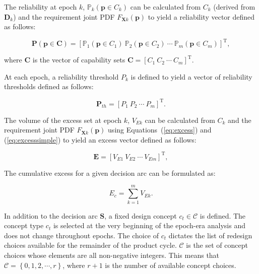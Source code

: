 The reliability at epoch $k$, $\mathbb{P}_k(\mathbf{p} \in C_k)$ can be calculated from $C_k$ (derived from $\mathbf{D}_k$) and the requirement joint \ac{PDF} $F_{\mathbf{X}k}(\mathbf{p})$ to yield a reliability vector defined as follows:

\begin{equation} \label{eq:reliabilityvector}
	\mathbf{P}(\mathbf{p} \in \mathbf{C}) = \left[\mathbb{P}_1(\mathbf{p} \in C_1) ~ \mathbb{P}_2(\mathbf{p} \in C_2) ~ \cdots ~ \mathbb{P}_m(\mathbf{p} \in C_m)\right]^{\mathrm{T}},
\end{equation}

where $\mathbf{C}$ is the vector of capability sets $\mathbf{C} = \left[C_1 ~ C_2 ~ \cdots ~ C_m\right]^{\mathrm{T}}$.

At each epoch, a reliability threshold $P_k$ is defined to yield a vector of reliability thresholds defined as follows:

\begin{equation} \label{eq:reliabilitythvector}
	\mathbf{P}_{th} = \left[P_1 ~ P_2 ~ \cdots ~ P_m\right]^{\mathrm{T}}.
\end{equation}

The volume of the excess set at epoch $k$, $V_{Ek}$ can be calculated from $C_k$ and the requirement joint \ac{PDF} $F_{\mathbf{X}k}(\mathbf{p})$ using Equations~(\ref{eq:excess}) and (\ref{eq:excesssimple}) to yield an excess vector defined as follows:

\begin{equation} \label{eq:excessvector}
	\mathbf{E} = \left[V_{E1} ~ V_{E2} ~ \cdots ~ V_{Em}\right]^{\mathrm{T}},
\end{equation}

The cumulative excess for a given decision arc can be formulated as:

\begin{equation} \label{eq:excesscumulative}
	E_c = \sum\limits_{k=1}^{m} V_{Ek}.
\end{equation}

In addition to the decision arc $\mathbf{S}$, a fixed design concept $c_t\in\mathcal{C}$ is defined. The concept type $c_t$ is selected at the very beginning of the epoch-era analysis and does not change throughout epochs. The choice of $c_t$ dictates the list of redesign choices available for the remainder of the product cycle. $\mathcal{C}$ is the set of concept choices whose elements are all non-negative integers. This means that $\mathcal{C} = \left\{0,1,2,\cdots,r\right\}$, where $r + 1$ is the number of available concept choices.

